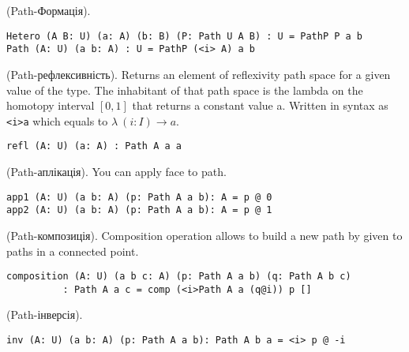 \begin{definition} (Path-Формація).
\begin{lstlisting}
Hetero (A B: U) (a: A) (b: B) (P: Path U A B) : U = PathP P a b
Path (A: U) (a b: A) : U = PathP (<i> A) a b
\end{lstlisting}
\end{definition}

\begin{definition} (Path-рефлексивність).
Returns an element of reflexivity path space for a given value of the type.
The inhabitant of that path space is the lambda on the homotopy
interval $[0,1]$ that returns a constant value a. Written in
syntax as \lstinline{<i>a} which equals to $\lambda\ (i: I) \rightarrow a$.
\begin{lstlisting}
refl (A: U) (a: A) : Path A a a
\end{lstlisting}
\end{definition}

\begin{definition} (Path-аплікація).
You can apply face to path.
\begin{lstlisting}
app1 (A: U) (a b: A) (p: Path A a b): A = p @ 0
app2 (A: U) (a b: A) (p: Path A a b): A = p @ 1
\end{lstlisting}
\end{definition}

\begin{definition} (Path-композиція).
Composition operation allows to build a new path by given to paths
in a connected point.
\begin{center}
\end{center}
\begin{lstlisting}
composition (A: U) (a b c: A) (p: Path A a b) (q: Path A b c)
          : Path A a c = comp (<i>Path A a (q@i)) p []
\end{lstlisting}
\end{definition}

\begin{theorem} (Path-інверсія).
\begin{lstlisting}
inv (A: U) (a b: A) (p: Path A a b): Path A b a = <i> p @ -i
\end{lstlisting}
\end{theorem}

